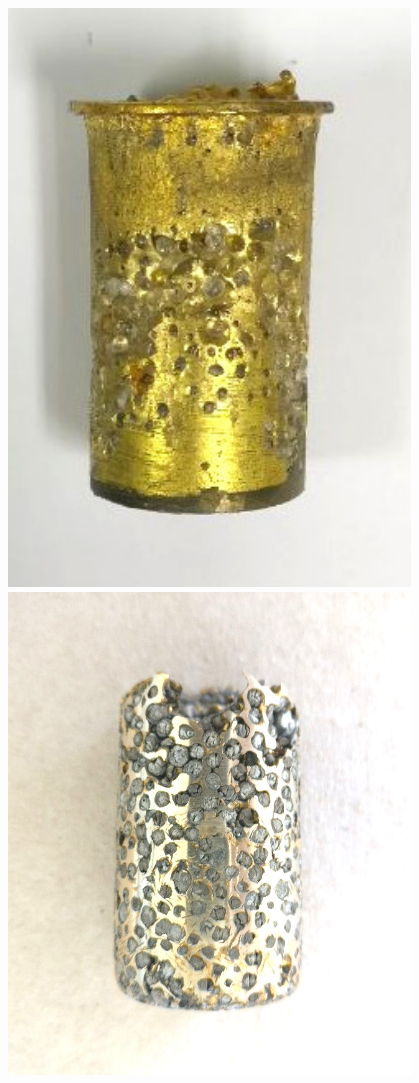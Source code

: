 \documentclass[usenames,dvipsnames]{beamer}
\begin{document}
\begin{frame}
\begin{center}
\begin{columns}
\includegraphics[width=0.8\textwidth]{img/proceso/proceso1.jpg}
\includegraphics[width=0.8\textwidth]{img/proceso/proceso2.jpg}

\end{columns}
\end{center}
\end{frame}
\end{document}
